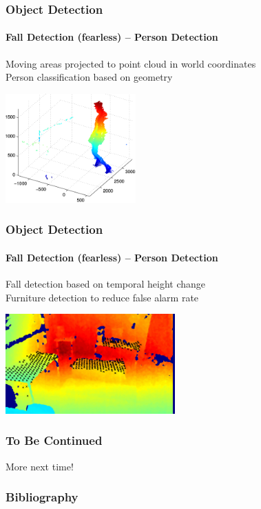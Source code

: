 \documentclass[xetex,professionalfont]{beamer}
\begin{document}
\begin{frame}
\frametitle{Object Detection}
\framesubtitle{Fall Detection (fearless) -- Person Detection}

Moving areas projected to point cloud in world coordinates\\\medskip
Person classification based on geometry %

\bigskip
\begin{center}
\includegraphics[width=5cm]{figures/fearless-pc.png}
\end{center}

\end{frame}


\begin{frame}
\frametitle{Object Detection}
\framesubtitle{Fall Detection (fearless) -- Person Detection}

Fall detection based on temporal height change\\\medskip
Furniture detection to reduce false alarm rate

\bigskip
\begin{center}
\includegraphics[width=6.5cm]{figures/reclaim-furniture-detection.jpg}
\end{center}

\end{frame}


\begin{frame}
\frametitle{To Be Continued}

\begin{center}
	More next time!
\end{center}

\end{frame}


\begin{frame}
\frametitle{Bibliography}

\printbibliography

\end{frame}
\end{document}
